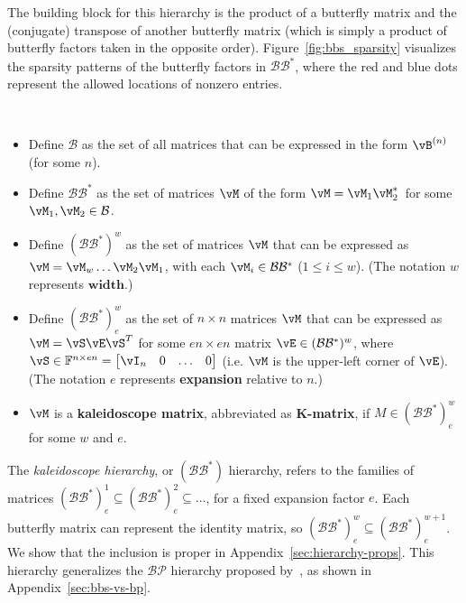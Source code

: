 The building block for this hierarchy is the product of a butterfly matrix and the (conjugate) transpose of another butterfly matrix (which is simply a product of butterfly factors taken in the opposite order).
Figure~\ref{fig:bbs_sparsity} visualizes the sparsity patterns of the butterfly factors in $\mathcal{B}\mathcal{B}^*$, where the red and blue dots represent the allowed locations of nonzero entries.

\begin{definition}\ \label{def:hierarchy}
    \begin{itemize}[topsep=0em, partopsep=0.0em, itemsep=0em, parsep=0.3em, leftmargin=1em]

        \item Define $\mathcal{B}$ as the set of all matrices that can be expressed in the form $\vB^{(n)}$ (for some $n$).
        \item Define $\mathcal{B}\mathcal{B}^*$ as the set of matrices $\vM$ of the form $\vM = \vM_1 \vM_2^*$\, for some $\vM_1, \vM_2 \in \mathcal{B}$.
        \item Define $(\mathcal{B}\mathcal{B}^*)^w$ as the set of matrices $\vM$ that can be expressed as $\vM = \vM_w \hdots \vM_2 \vM_1$, with each $\vM_i \in \mathcal{B}\mathcal{B}^*$ ($1 \leq i \leq w$). (The notation $w$ represents $\textbf{width}$.)
        \item Define $(\mathcal{B}\mathcal{B}^*)^w_e$ as the set of $n \times n$ matrices $\vM$ that can be expressed as $\vM  = \vS \vE \vS^T$ for some $en \times en$ matrix $\vE \in (\mathcal{B}\mathcal{B}^*)^w$, where $\vS \in \mathbb{F}^{n \times en} = \begin{bmatrix} \vI_n & 0 & \hdots & 0 \end{bmatrix}$ (i.e. $\vM$ is the upper-left corner of $\vE$). (The notation $e$ represents \textbf{expansion} relative to $n$.)
        \item $\vM$ is a \textbf{kaleidoscope matrix}, abbreviated as
        \textbf{K-matrix}, if $M \in (\mathcal{B}\mathcal{B}^*)^w_e$ for some $w$ and $e$.
    \end{itemize}
\end{definition}

\label{sec:hierarchy-def}
The \emph{kaleidoscope hierarchy}, or $(\mathcal{B}\mathcal{B}^*)$ hierarchy, refers to the families of matrices $(\mathcal{B}\mathcal{B}^*)^1_e \subseteq (\mathcal{B}\mathcal{B}^*)^2_e \subseteq \dots$, for a fixed expansion factor $e$. Each butterfly matrix can represent the identity matrix, so
$(\mathcal{B}\mathcal{B}^*)^w_e \subseteq (\mathcal{B}\mathcal{B}^*)^{w+1}_e$.
We show that the inclusion is proper in Appendix~\ref{sec:hierarchy-props}.
 This hierarchy generalizes the $\mathcal{BP}$ hierarchy proposed by~\cite{dao2019learning}, as shown in Appendix~\ref{sec:bbs-vs-bp}.

